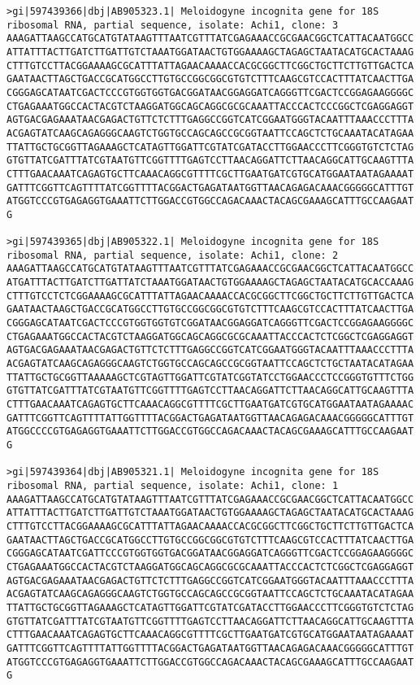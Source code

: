 \documentclass[11pt]{article}
\begin{document}
\begin{Verbatim}[commandchars=\\\{\}]
>gi|597439366|dbj|AB905323.1| Meloidogyne incognita gene for 18S ribosomal RNA, partial sequence, isolate: Achi1, clone: 3
AAAGATTAAGCCATGCATGTATAAGTTTAATCGTTTATCGAGAAACCGCGAACGGCTCATTACAATGGCC
ATTATTTACTTGATCTTGATTGTCTAAATGGATAACTGTGGAAAAGCTAGAGCTAATACATGCACTAAAG
CTTTGTCCTTACGGAAAAGCGCATTTATTAGAACAAAACCACGCGGCTTCGGCTGCTTCTTGTTGACTCA
GAATAACTTAGCTGACCGCATGGCCTTGTGCCGGCGGCGTGTCTTTCAAGCGTCCACTTTATCAACTTGA
CGGGAGCATAATCGACTCCCGTGGTGGTGACGGATAACGGAGGATCAGGGTTCGACTCCGGAGAAGGGGC
CTGAGAAATGGCCACTACGTCTAAGGATGGCAGCAGGCGCGCAAATTACCCACTCCCGGCTCGAGGAGGT
AGTGACGAGAAATAACGAGACTGTTCTCTTTGAGGCCGGTCATCGGAATGGGTACAATTTAAACCCTTTA
ACGAGTATCAAGCAGAGGGCAAGTCTGGTGCCAGCAGCCGCGGTAATTCCAGCTCTGCAAATACATAGAA
TTATTGCTGCGGTTAGAAAGCTCATAGTTGGATTCGTATCGATACCTTGGAACCCTTCGGGTGTCTCTAG
GTGTTATCGATTTATCGTAATGTTCGGTTTTGAGTCCTTAACAGGATTCTTAACAGGCATTGCAAGTTTA
CTTTGAACAAATCAGAGTGCTTCAAACAGGCGTTTTCGCTTGAATGATCGTGCATGGAATAATAGAAAAT
GATTTCGGTTCAGTTTTATCGGTTTTACGGACTGAGATAATGGTTAACAGAGACAAACGGGGGCATTTGT
ATGGTCCCGTGAGAGGTGAAATTCTTGGACCGTGGCCAGACAAACTACAGCGAAAGCATTTGCCAAGAAT
G

>gi|597439365|dbj|AB905322.1| Meloidogyne incognita gene for 18S ribosomal RNA, partial sequence, isolate: Achi1, clone: 2
AAAGATTAAGCCATGCATGTATAAGTTTAATCGTTTATCGAGAAACCGCGAACGGCTCATTACAATGGCC
ATGATTTACTTGATCTTGATTATCTAAATGGATAACTGTGGAAAAGCTAGAGCTAATACATGCACCAAAG
CTTTGTCCTCTCGGAAAAGCGCATTTATTAGAACAAAACCACGCGGCTTCGGCTGCTTCTTGTTGACTCA
GAATAACTAAGCTGACCGCATGGCCTTGTGCCGGCGGCGTGTCTTTCAAGCGTCCACTTTATCAACTTGA
CGGGAGCATAATCGACTCCCGTGGTGGTGTCGGATAACGGAGGATCAGGGTTCGACTCCGGAGAAGGGGC
CTGAGAAATGGCCACTACGTCTAAGGATGGCAGCAGGCGCGCAAATTACCCACTCTCGGCTCGAGGAGGT
AGTGACGAGAAATAACGAGACTGTTCTCTTTGAGGCCGGTCATCGGAATGGGTACAATTTAAACCCTTTA
ACGAGTATCAAGCAGAGGGCAAGTCTGGTGCCAGCAGCCGCGGTAATTCCAGCTCTGCTAATACATAGAA
TTATTGCTGCGGTTAAAAAGCTCGTAGTTGGATTCGTATCGGTATCCTGGAACCCTCCGGGTGTTTCTGG
GTGTTATCGATTTATCGTAATGTTCGGTTTTGAGTCCTTAACAGGATTCTTAACAGGCATTGCAAGTTTA
CTTTGAACAAATCAGAGTGCTTCAAACAGGCGTTTTCGCTTGAATGATCGTGCATGGAATAATAGAAAAC
GATTTCGGTTCAGTTTTATTGGTTTTACGGACTGAGATAATGGTTAACAGAGACAAACGGGGGCATTTGT
ATGGCCCCGTGAGAGGTGAAATTCTTGGACCGTGGCCAGACAAACTACAGCGAAAGCATTTGCCAAGAAT
G

>gi|597439364|dbj|AB905321.1| Meloidogyne incognita gene for 18S ribosomal RNA, partial sequence, isolate: Achi1, clone: 1
AAAGATTAAGCCATGCATGTATAAGTTTAATCGTTTATCGAGAAACCGCGAACGGCTCATTACAATGGCC
ATTATTTACTTGATCTTGATTGTCTAAATGGATAACTGTGGAAAAGCTAGAGCTAATACATGCACTAAAG
CTTTGTCCTTACGGAAAAGCGCATTTATTAGAACAAAACCACGCGGCTTCGGCTGCTTCTTGTTGACTCA
GAATAACTTAGCTGACCGCATGGCCTTGTGCCGGCGGCGTGTCTTTCAAGCGTCCACTTTATCAACTTGA
CGGGAGCATAATCGATTCCCGTGGTGGTGACGGATAACGGAGGATCAGGGTTCGACTCCGGAGAAGGGGC
CTGAGAAATGGCCACTACGTCTAAGGATGGCAGCAGGCGCGCAAATTACCCACTCTCGGCTCGAGGAGGT
AGTGACGAGAAATAACGAGACTGTTCTCTTTGAGGCCGGTCATCGGAATGGGTACAATTTAAACCCTTTA
ACGAGTATCAAGCAGAGGGCAAGTCTGGTGCCAGCAGCCGCGGTAATTCCAGCTCTGCAAATACATAGAA
TTATTGCTGCGGTTAGAAAGCTCATAGTTGGATTCGTATCGATACCTTGGAACCCTTCGGGTGTCTCTAG
GTGTTATCGATTTATCGTAATGTTCGGTTTTGAGTCCTTAACAGGATTCTTAACAGGCATTGCAAGTTTA
CTTTGAACAAATCAGAGTGCTTCAAACAGGCGTTTTCGCTTGAATGATCGTGCATGGAATAATAGAAAAT
GATTTCGGTTCAGTTTTATTGGTTTTACGGACTGAGATAATGGTTAACAGAGACAAACGGGGGCATTTGT
ATGGTCCCGTGAGAGGTGAAATTCTTGGACCGTGGCCAGACAAACTACAGCGAAAGCATTTGCCAAGAAT
G


\end{Verbatim}
\end{document}
